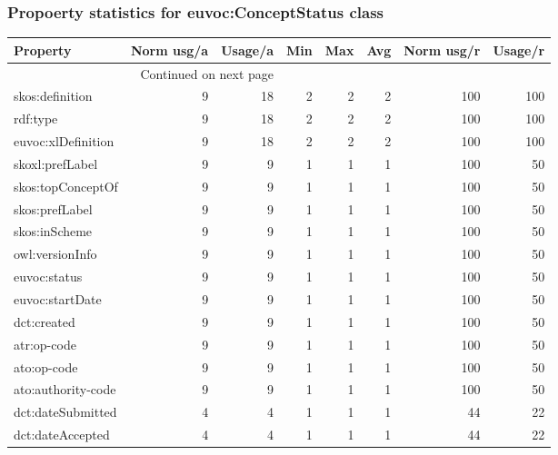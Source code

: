 \documentclass[10pt,a4paper,titlepage,final]{article}
\begin{document}
\subsubsection{Propoerty statistics for euvoc:ConceptStatus class}
\begin{longtable}{lrrrrrrr}
\toprule
           Property &  Norm usg/a &  Usage/a &  Min &  Max &  Avg &  Norm usg/r &  Usage/r \\
\midrule
\endhead
\midrule
\multicolumn{3}{r}{{Continued on next page}} \\
\midrule
\endfoot

\bottomrule
\endlastfoot
    skos:definition &           9 &       18 &    2 &    2 &    2 &         100 &      100 \\
           rdf:type &           9 &       18 &    2 &    2 &    2 &         100 &      100 \\
 euvoc:xlDefinition &           9 &       18 &    2 &    2 &    2 &         100 &      100 \\
    skoxl:prefLabel &           9 &        9 &    1 &    1 &    1 &         100 &       50 \\
  skos:topConceptOf &           9 &        9 &    1 &    1 &    1 &         100 &       50 \\
     skos:prefLabel &           9 &        9 &    1 &    1 &    1 &         100 &       50 \\
      skos:inScheme &           9 &        9 &    1 &    1 &    1 &         100 &       50 \\
    owl:versionInfo &           9 &        9 &    1 &    1 &    1 &         100 &       50 \\
       euvoc:status &           9 &        9 &    1 &    1 &    1 &         100 &       50 \\
    euvoc:startDate &           9 &        9 &    1 &    1 &    1 &         100 &       50 \\
        dct:created &           9 &        9 &    1 &    1 &    1 &         100 &       50 \\
        atr:op-code &           9 &        9 &    1 &    1 &    1 &         100 &       50 \\
        ato:op-code &           9 &        9 &    1 &    1 &    1 &         100 &       50 \\
 ato:authority-code &           9 &        9 &    1 &    1 &    1 &         100 &       50 \\
  dct:dateSubmitted &           4 &        4 &    1 &    1 &    1 &          44 &       22 \\
   dct:dateAccepted &           4 &        4 &    1 &    1 &    1 &          44 &       22 \\
\end{longtable}
\end{document}
